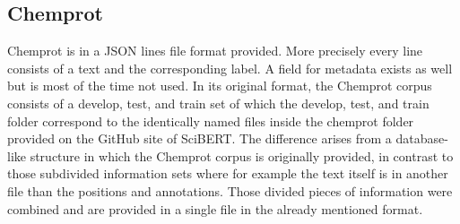 \subsection{Chemprot}
Chemprot is in a JSON lines file format provided. More precisely every line consists of a text and the corresponding label. A field for metadata exists as well but is most of the time not used. In its original format, the Chemprot corpus consists of a develop, test, and train set of which the develop, test, and train folder correspond to the identically named files inside the chemprot folder provided on the GitHub site of SciBERT. The difference arises from a database-like structure in which the Chemprot corpus is originally provided, in contrast to those subdivided information sets where for example the text itself is in another file than the positions and annotations. Those divided pieces of information were combined and are provided in a single file in the already mentioned format. \cite{Beltagy2019,Wang2016}